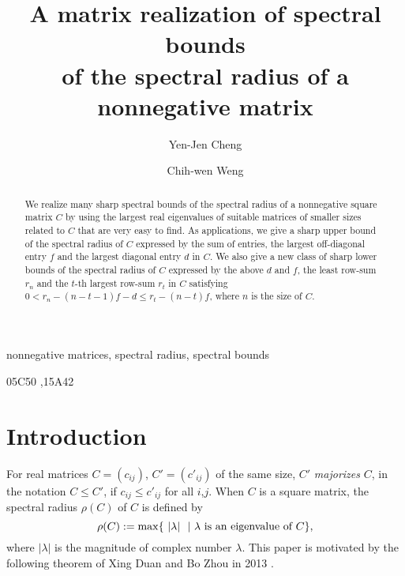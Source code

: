 \documentclass[final,3p, times, 12pt]{elsarticle}
\theoremstyle{plain}
\theoremstyle{definition}
\theoremstyle{remark}
\numberwithin{equation}{section}
\begin{document}
\begin{frontmatter}

\title{A matrix realization of spectral bounds \\ of the spectral radius of a nonnegative matrix}


\author[NCTU]{Yen-Jen Cheng}
\author[NCTU]{Chih-wen Weng}



\address[NCTU]{Department of Applied Mathematics, National Chiao Tung University, 1001 Ta Hsueh Road, Hsinchu, Taiwan.}



\begin{abstract}
We  realize many sharp spectral bounds of the spectral radius of a nonnegative square matrix $C$ by using the largest real eigenvalues of  suitable matrices of smaller sizes related to $C$ that are very easy to find.
As applications, we give a sharp upper bound of the spectral radius of $C$ expressed by the sum of entries, the largest off-diagonal entry $f$ and the largest diagonal entry $d$ in $C$.
We also give a new class of sharp lower bounds of the spectral radius of $C$ expressed
 by the above $d$ and $f$, the least row-sum $r_n$ and the $t$-th largest row-sum $r_t$ in $C$ satisfying
 $0<r_n-(n-t-1)f-d\leq r_t-(n-t)f$, where $n$ is the size of $C$.
\end{abstract}

\begin{keyword}
nonnegative matrices, spectral radius, spectral bounds

\MSC[2010]05C50 \sep 15A42
\end{keyword}
\bigskip

\end{frontmatter}




\section{Introduction}\label{s1}

For real matrices $C=(c_{ij})$, $C'=(c'_{ij})$ of the same size, $C'$ {\it majorizes} $C$, in the notation  $C\leq C'$, if $c_{ij}\leq c'_{ij}$ for all $i$,$j$. When $C$ is a square matrix, the spectral radius $\rho(C)$ of $C$ is defined by
$$\rho(C):=\max\{~|\lambda|~\ |~\lambda\hbox{ is an eigenvalue of $C$}\},$$
where $|\lambda|$ is the magnitude of complex number $\lambda.$
This paper is motivated by the following theorem of   Xing Duan and Bo Zhou in 2013 \cite[Theorem 2.1]{dz}.
\end{document}
